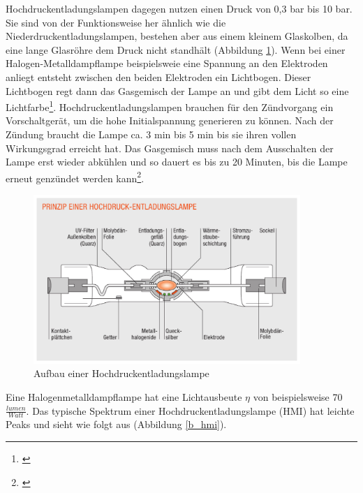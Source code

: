 \noindent Hochdruckentladungslampen dagegen nutzen einen Druck von 0,3 bar bis 10 bar. Sie sind von der Funktionsweise her ähnlich wie die Niederdruckentladungslampen, bestehen aber aus einem kleinem Glaskolben, da eine lange Glasröhre dem Druck nicht standhält (Abbildung \ref{b_hochdruck}). Wenn bei einer Halogen-Metalldampflampe beispielsweie eine Spannung an den Elektroden anliegt entsteht zwischen den beiden Elektroden ein Lichtbogen. Dieser Lichtbogen regt dann das Gasgemisch der Lampe an und gibt dem Licht so eine Lichtfarbe\footnote{\cite[129]{ris}}.
Hochdruckentladungslampen brauchen für den Zündvorgang ein Vorschaltgerät, um die hohe Initialspannung generieren zu können. Nach der Zündung braucht die Lampe ca. 3 min bis 5 min bis sie ihren vollen Wirkungsgrad erreicht hat. Das Gasgemisch muss nach dem Ausschalten der Lampe erst wieder abkühlen und so dauert es bis zu 20 Minuten, bis die Lampe erneut genzündet werden kann\footnote{\cite[147]{mueller}}.

\begin{figure}[htp]     %
\centering
\includegraphics[width=0.9\textwidth]{bilder/hochdruck} 
\caption {Aufbau einer Hochdruckentladungslampe\protect\footnotemark}\label{b_hochdruck}
\end{figure}
\noindent Eine Halogenmetalldampflampe hat eine Lichtausbeute $\eta$ von beispielsweise 70 $\frac{lumen}{Watt}$. Das typische Spektrum einer Hochdruckentladungslampe (HMI) hat leichte Peaks und sieht wie folgt aus (Abbildung \ref{b_hmi}).

